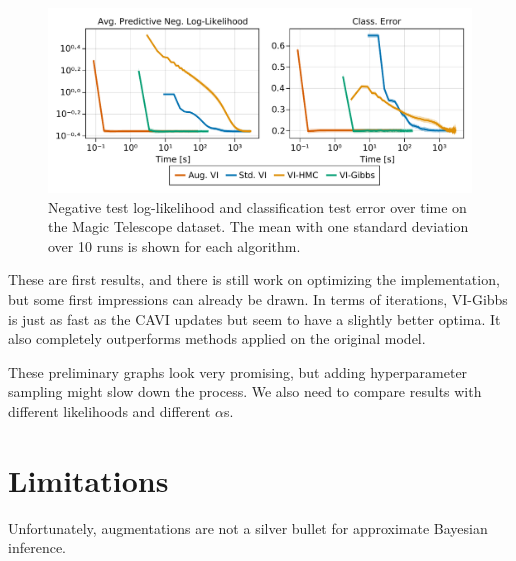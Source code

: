 \begin{figure}[H]
    \centering
    \includegraphics[width=\textwidth]{./chapters/8_discussions/figures/magictelescope.pdf}
    \caption{Negative test log-likelihood and classification test error over time on the Magic Telescope dataset.
    The mean with one standard deviation over 10 runs is shown for each algorithm.
    }
    \label{fig:magictelescope}
\end{figure}

These are first results, and there is still work on optimizing the implementation, but some first impressions can already be drawn.
In terms of iterations, VI-Gibbs is just as fast as the \ac{CAVI} updates but seem to have a slightly better optima.
It also completely outperforms methods applied on the original model.

These preliminary graphs look very promising, but adding hyperparameter sampling might slow down the process.
We also need to compare results with different likelihoods and different $\alpha$s.



\section{Limitations}
\label{sec:limits}
Unfortunately, augmentations are not a silver bullet for approximate Bayesian inference.
